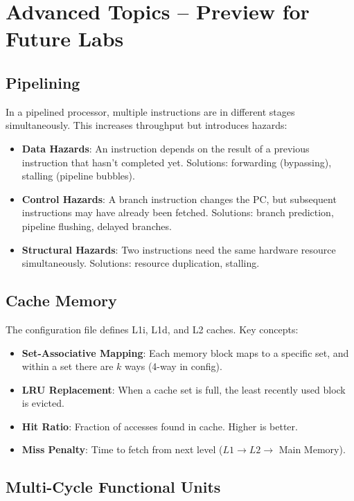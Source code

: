 \documentclass[12pt,a4paper]{article}
\begin{document}
\section{Advanced Topics -- Preview for Future Labs}

\subsection{Pipelining}

In a pipelined processor, multiple instructions are in different stages simultaneously. This increases throughput but introduces hazards:

\begin{itemize}
    \item \textbf{Data Hazards}: An instruction depends on the result of a previous instruction that hasn't completed yet. Solutions: forwarding (bypassing), stalling (pipeline bubbles).
    \item \textbf{Control Hazards}: A branch instruction changes the PC, but subsequent instructions may have already been fetched. Solutions: branch prediction, pipeline flushing, delayed branches.
    \item \textbf{Structural Hazards}: Two instructions need the same hardware resource simultaneously. Solutions: resource duplication, stalling.
\end{itemize}

\subsection{Cache Memory}

The configuration file defines L1i, L1d, and L2 caches. Key concepts:
\begin{itemize}
    \item \textbf{Set-Associative Mapping}: Each memory block maps to a specific set, and within a set there are $k$ ways (4-way in config).
    \item \textbf{LRU Replacement}: When a cache set is full, the least recently used block is evicted.
    \item \textbf{Hit Ratio}: Fraction of accesses found in cache. Higher is better.
    \item \textbf{Miss Penalty}: Time to fetch from next level ($L1 \to L2 \to$ Main Memory).
\end{itemize}

\subsection{Multi-Cycle Functional Units}
\end{document}
